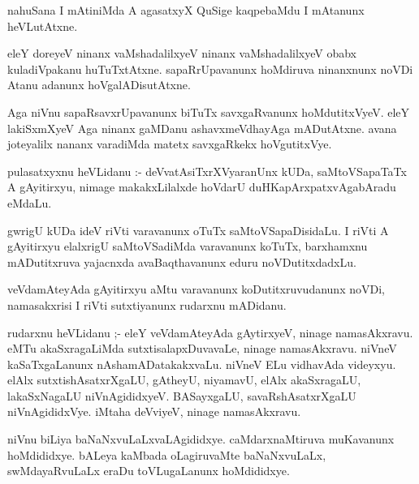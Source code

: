 \documentclass{article}
\begin{document}
\begin{mn}
nahuSana  I mAtiniMda  A  agasatxyX QuSige  kaqpebaMdu  I mAtanunx  heVLutAtxne.
\end{mn}

\begin{mn}
eleY doreyeV  ninanx  vaMshadalilxyeV  ninanx  vaMshadalilxyeV  obabx  kuladiVpakanu  huTuTxtAtxne.  
sapaRrUpavanunx  hoMdiruva  ninanxnunx  noVDi  Atanu  adanunx  hoVgalADisutAtxne.
\end{mn}

\begin{mn}
Aga niVnu sapaRsavxrUpavanunx  biTuTx  savxgaRvanunx  hoMdutitxVyeV.  eleY  
lakiSxmXyeV  Aga  ninanx  gaMDanu  ashavxmeVdhayAga mADutAtxne. avana  
joteyalilx  nananx  varadiMda  matetx  savxgaRkekx  hoVgutitxVye.
\end{mn}

\begin{mn}
pulasatxyxnu  heVLidanu :- deVvatAsiTxrXVyaranUnx  kUDa, saMtoVSapaTaTx  A  
gAyitirxyu,  nimage makakxLilalxde  hoVdarU  duHKapArxpatxvAgabAradu  eMdaLu.
\end{mn}

\begin{mn}
gwrigU  kUDa  ideV  riVti  varavanunx  oTuTx  saMtoVSapaDisidaLu.  I riVti 
A gAyitirxyu  elalxrigU  saMtoVSadiMda  varavanunx  koTuTx,  barxhamxnu  
mADutitxruva  yajacnxda  avaBaqthavanunx  eduru  noVDutitxdadxLu.
\end{mn}

\begin{mn}
veVdamAteyAda  gAyitirxyu  aMtu  varavanunx  koDutitxruvudanunx  noVDi,  
namasakxrisi  I riVti  sutxtiyanunx  rudarxnu  mADidanu.
\end{mn}

\begin{mn}
rudarxnu  heVLidanu ;- eleY  veVdamAteyAda  gAytirxyeV,  ninage  namasAkxravu.  eMTu  
akaSxragaLiMda  sutxtisalapxDuvavaLe,  ninage  namasAkxravu.  niVneV  kaSaTxgaLanunx  
nAshamADatakakxvaLu.  niVneV  ELu  vidhavAda  videyxyu.  elAlx  sutxtishAsatxrXgaLU,  
gAtheyU,  niyamavU,  elAlx akaSxragaLU,  lakaSxNagaLU  niVnAgididxyeV.  BASayxgaLU,  
savaRshAsatxrXgaLU  niVnAgididxVye.  iMtaha  deVviyeV,  ninage  namasAkxravu.
\end{mn}

\begin{mn}
niVnu  biLiya  baNaNxvuLaLxvaLAgididxye.  caMdarxnaMtiruva  muKavanunx  hoMdididxye.  
bALeya  kaMbada  oLagiruvaMte  baNaNxvuLaLx, swMdayaRvuLaLx  eraDu  toVLugaLanunx  hoMdididxye.
\end{mn}
\end{document}
